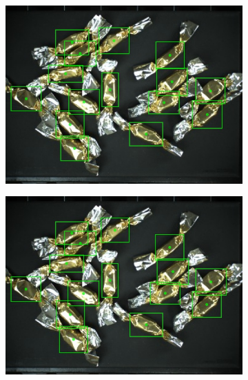 \begin{figure}[H]
\begin{subfigure}{0.5\textwidth}
  \end{subfigure}
  \begin{subfigure}{0.5\textwidth}
    \centering
    \includegraphics[width=\linewidth]{Sources/Figures/appendix/actual_117.jpg}

  \end{subfigure}
  \begin{subfigure}{0.5\textwidth}
    \centering
    \includegraphics[width=\linewidth]{Sources/Figures/appendix/pred_117.jpg}


\end{subfigure}
\end{figure}
